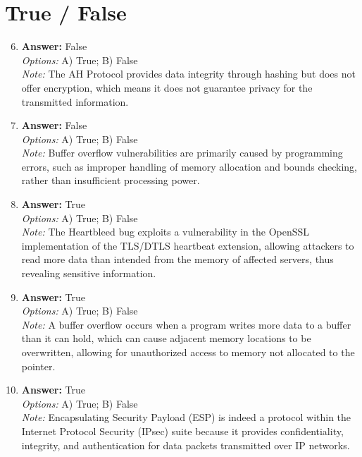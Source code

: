 \documentclass[12pt]{article}
\begin{document}
\section*{True / False}
\begin{enumerate}[label=\arabic*.]
\setcounter{enumi}{5}
\item \textbf{Answer:} False
\\ \textit{Options:} A) True; B) False
\\ \textit{Note:} The AH Protocol provides data integrity through hashing but does not offer encryption, which means it does not guarantee privacy for the transmitted information.
\item \textbf{Answer:} False
\\ \textit{Options:} A) True; B) False
\\ \textit{Note:} Buffer overflow vulnerabilities are primarily caused by programming errors, such as improper handling of memory allocation and bounds checking, rather than insufficient processing power.
\item \textbf{Answer:} True
\\ \textit{Options:} A) True; B) False
\\ \textit{Note:} The Heartbleed bug exploits a vulnerability in the OpenSSL implementation of the TLS/DTLS heartbeat extension, allowing attackers to read more data than intended from the memory of affected servers, thus revealing sensitive information.
\item \textbf{Answer:} True
\\ \textit{Options:} A) True; B) False
\\ \textit{Note:} A buffer overflow occurs when a program writes more data to a buffer than it can hold, which can cause adjacent memory locations to be overwritten, allowing for unauthorized access to memory not allocated to the pointer.
\item \textbf{Answer:} True
\\ \textit{Options:} A) True; B) False
\\ \textit{Note:} Encapsulating Security Payload (ESP) is indeed a protocol within the Internet Protocol Security (IPsec) suite because it provides confidentiality, integrity, and authentication for data packets transmitted over IP networks.
\end{enumerate}
\end{document}
